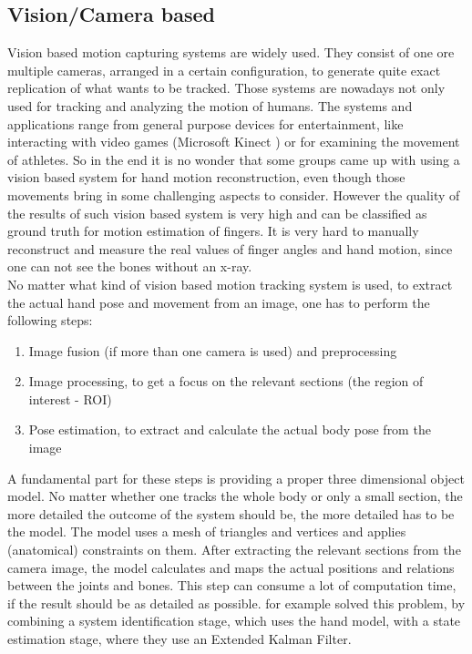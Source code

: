 \subsection{Vision/Camera based} \label{subsec:approaches:vision}
Vision based motion capturing systems are widely used. They consist of one ore multiple cameras, arranged in a certain configuration, to generate quite exact replication of what wants to be tracked. Those systems are nowadays not only used for tracking and analyzing the motion of humans. The systems and applications range from general purpose devices for entertainment, like interacting with video games (Microsoft Kinect ) or for examining the movement of athletes. So in the end it is no wonder that some groups came up with using a vision based system for hand motion reconstruction, even though those movements bring in some challenging aspects to consider. However the quality of the results of such vision based system is very high and can be classified as ground truth for motion estimation of fingers. It is very hard to manually reconstruct and measure the real values of finger angles and hand motion, since one can not see the bones without an x-ray. \\
No matter what kind of vision based motion tracking system is used, to extract the actual hand pose and movement from an image, one has to perform the following steps:
\begin{enumerate}
\item Image fusion (if more than one camera is used) and preprocessing
\item Image processing, to get a focus on the relevant sections (the region of interest - ROI) 
\item Pose estimation, to extract and calculate the actual body pose from the image
\end{enumerate}
A fundamental part for these steps is providing a proper three dimensional object model. No matter whether one tracks the whole body or only a small section, the more detailed the outcome of the system should be, the more detailed has to be the model. The model uses a mesh of triangles and vertices and applies (anatomical) constraints on them. After extracting the relevant sections from the camera image, the model calculates and maps the actual positions and relations between the joints and bones. This step can consume a lot of computation time, if the result should be as detailed as possible. \cite{yun2013accurate} for example solved this problem, by combining a system identification stage, which uses the hand model, with a state estimation stage, where they use an Extended Kalman Filter.

